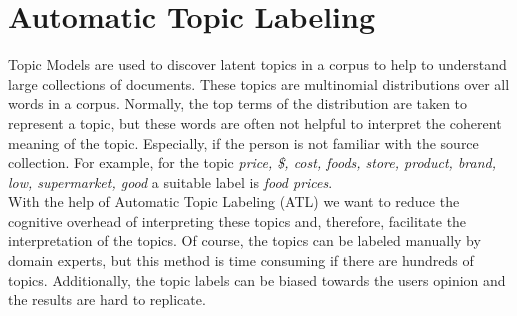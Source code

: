 
\section{Automatic Topic Labeling}
\label{kap:automaticTL}




Topic Models are used to discover latent topics in a corpus to help to understand large collections of documents. These topics are multinomial distributions over all words in a corpus. Normally, the top terms of the distribution are taken to represent a topic, but these words are often not helpful to interpret the coherent meaning of the topic. Especially, if the person is not familiar with the source collection. For example, for the topic \textit{price, \$, cost, foods, store, product, brand, low, supermarket, good} a  suitable label is \textit{food prices}.\\

With the help of Automatic Topic Labeling (\ac{ATL}) we want to reduce the cognitive overhead of interpreting these topics and, therefore, facilitate the interpretation of the topics.
Of course, the topics can be labeled manually by domain experts, but this method is time consuming if there are hundreds of topics. Additionally, the topic labels can be biased towards the users opinion and the results are hard to replicate. \\


